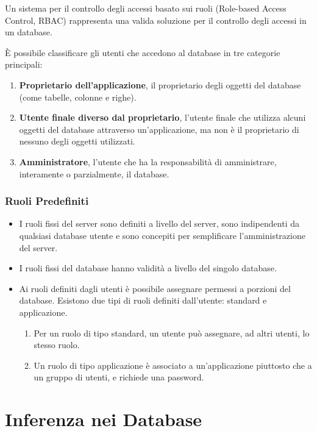 Un sistema per il controllo degli accessi basato sui ruoli (Role-based Access Control, RBAC) rappresenta una valida soluzione per il controllo degli accessi in un database.

È possibile classificare gli utenti che accedono al database in tre categorie principali:

\begin{enumerate}
    \item \textbf{Proprietario dell'applicazione}, il proprietario degli oggetti del database (come tabelle, colonne e righe).
    \item \textbf{Utente finale diverso dal proprietario}, l'utente finale che utilizza alcuni oggetti del database attraverso un'applicazione, ma non è il proprietario di nessuno degli oggetti utilizzati.
    \item \textbf{Amministratore}, l'utente che ha la responsabilità di amministrare, interamente o parzialmente, il database.
\end{enumerate}

\subsubsection{Ruoli Predefiniti}

\begin{itemize}
    \item I ruoli fissi del server sono definiti a livello del server, sono indipendenti da qualsiasi database utente e sono concepiti per semplificare l'amministrazione del server.
    \item I ruoli fissi del database hanno validità a livello del singolo database.
    \item Ai ruoli definiti dagli utenti è possibile assegnare permessi a porzioni del database. Esistono due tipi di ruoli definiti dall'utente: standard e applicazione.
    \begin{enumerate}
        \item Per un ruolo di tipo standard, un utente può assegnare, ad altri utenti, lo stesso ruolo.
        \item Un ruolo di tipo applicazione è associato a un'applicazione piuttosto che a un gruppo di utenti, e richiede una password.
    \end{enumerate}
\end{itemize}

\section{Inferenza nei Database}

